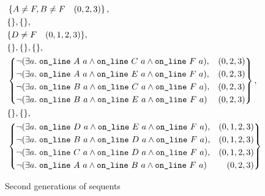 \begin{figure}[H]
{\begin{minipage}{\boxwidth}
\begin{displaymath}
\begin{split}
    &\left\{A\neq F, B\neq F \quad (0,2,3)\right\},\\
    &\{\},\{\},\\
    &\{D\neq F \quad (0,1,2,3)\},\\
    &\{\},\{\},\{\},\\
    &\left\{\begin{aligned} 
        &\Triangle{a}{A}{C}{F}, & (0,2,3)\\
        &\Triangle{a}{A}{E}{F}, & (0,2,3)\\
        &\Triangle{a}{B}{C}{F}, & (0,2,3)\\
        &\Triangle{a}{B}{E}{F} & (0,2,3)\end{aligned}\right\},\\
    &\{\},\{\},\\
    &\left\{\begin{aligned} 
        &\Triangle{a}{D}{E}{F}, & (0,1,2,3)\\
        &\Triangle{a}{B}{D}{F}, & (0,1,2,3)\\
        &\Triangle{a}{C}{D}{F}, & (0,1,2,3)\\
        &\Triangle{a}{A}{B}{F} & (0,2,3)\end{aligned}\right\}
\end{split}
\end{displaymath}
\end{minipage}}
\caption{Second generations of sequents}
\label{fig:SecondGenerations}
\end{figure}

